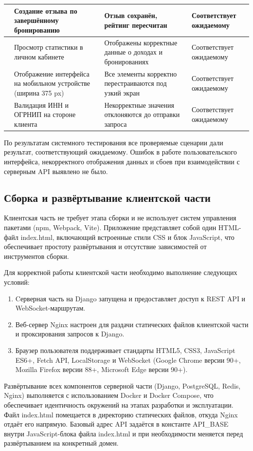 \begin{xltabular}{\textwidth}{|c|X|X|X|}
	 & \leftrow Создание отзыва по завершённому бронированию & \leftrow Отзыв сохранён, рейтинг пересчитан & \leftrow Соответствует ожидаемому \\ \hline
	 & \leftrow Просмотр статистики в личном кабинете & \leftrow Отображены корректные данные о доходах и бронированиях & \leftrow Соответствует ожидаемому \\ \hline
	 & \leftrow Отображение интерфейса на мобильном устройстве (ширина 375 px) & \leftrow Все элементы корректно перестраиваются под узкий экран & \leftrow Соответствует ожидаемому \\ \hline
	 & \leftrow Валидация ИНН и ОГРНИП на стороне клиента & \leftrow Некорректные значения отклоняются до отправки запроса & \leftrow Соответствует ожидаемому \\ \hline
\end{xltabular}

По результатам системного тестирования все проверяемые сценарии дали результат, соответствующий ожидаемому. Ошибок в работе пользовательского интерфейса, некорректного отображения данных и сбоев при взаимодействии с серверным API выявлено не было.

\subsection{Сборка и развёртывание клиентской части}
Клиентская часть не требует этапа сборки и не использует систем управления пакетами (npm, Webpack, Vite). Приложение представляет собой один HTML-файл index.html, включающий встроенные стили CSS и блок JavaScript, что обеспечивает простоту развёртывания и отсутствие зависимостей от инструментов сборки.

Для корректной работы клиентской части необходимо выполнение следующих условий:
\begin{enumerate}
\item Cерверная часть на Django запущена и предоставляет доступ к REST API и WebSocket-маршрутам.
\item Веб-сервер Nginx настроен для раздачи статических файлов клиентской части и проксирования запросов к Django.
\item Браузер пользователя поддерживает стандарты HTML5, CSS3, JavaScript ES6+, Fetch API, LocalStorage и WebSocket (Google Chrome версии 90+, Mozilla Firefox версии 88+, Microsoft Edge версии 90+).
\end{enumerate}

Развёртывание всех компонентов серверной части (Django, PostgreSQL, Redis, Nginx) выполняется с использованием Docker и Docker Compose, что обеспечивает идентичность окружений на этапах разработки и эксплуатации. Файл index.html помещается в директорию статических файлов, откуда Nginx отдаёт его напрямую. Базовый адрес API задаётся в константе API\_BASE внутри JavaScript-блока файла index.html и при необходимости меняется перед развёртыванием на конкретный домен.